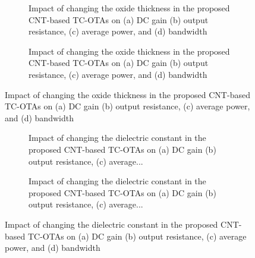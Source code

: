 \begin{figure}[htbp]
  \centering
  \begin{subfigure}[b]{0.48\linewidth}
    \centering
    \caption{Impact of changing the oxide thickness in the proposed CNT-based TC-OTAs on (a) DC gain (b) output resistance, (c) average power, and (d) bandwidth}

  \end{subfigure}
  \hfill
  \begin{subfigure}[b]{0.48\linewidth}
    \centering
    \caption{Impact of changing the oxide thickness in the proposed CNT-based TC-OTAs on (a) DC gain (b) output resistance, (c) average power, and (d) bandwidth}

  \end{subfigure}
  \caption{Impact of changing the oxide thickness in the proposed CNT-based TC-OTAs on (a) DC gain (b) output resistance, (c) average power, and (d) bandwidth}

  \label{fig:group_jnhxf}
\end{figure}

\begin{figure}[htbp]
  \centering
  \begin{subfigure}[b]{0.48\linewidth}
    \centering
    \caption{Impact of changing the dielectric constant in the proposed CNT-based TC-OTAs on (a) DC gain (b) output resistance, (c) average...}

  \end{subfigure}
  \hfill
  \begin{subfigure}[b]{0.48\linewidth}
    \centering
    \caption{Impact of changing the dielectric constant in the proposed CNT-based TC-OTAs on (a) DC gain (b) output resistance, (c) average...}

  \end{subfigure}
  \caption{Impact of changing the dielectric constant in the proposed CNT-based TC-OTAs on (a) DC gain (b) output resistance, (c) average power, and (d) bandwidth}

  \label{fig:group_m4kt3}
\end{figure}

